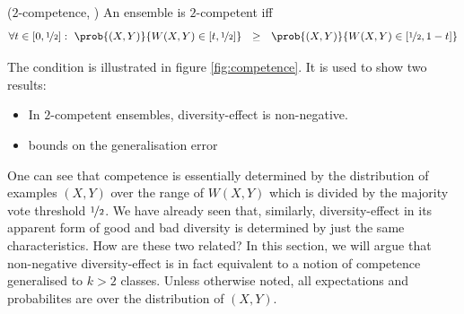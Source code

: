 \documentclass[../main.tex]{subfiles}
\begin{document}
\begin{definition} 
   \label{def:2-competence} 
    ($2$-competence, \cite{theisen_WhenAreEnsembles_2023}) An ensemble is $2$-competent iff
$$
\forall t \in \left[ 0, \nicefrac{1}{2} \right]: ~ \prob{(X,Y) }{W(X,Y)  \in \left[ t, \nicefrac{1}{2} \right]} ~ ~  \geq ~ ~ \prob{(X,Y) }{W(X,Y) \in \left[ \nicefrac{1}{2}, 1-t \right]}
$$
\end{definition}
The condition is illustrated in figure \ref{fig:competence}.  
It is used to show two results:
\begin{itemize}
	\item In $2$-competent ensembles, diversity-effect is non-negative.
	\item bounds on the generalisation error  %
\end{itemize}

One can see that competence is essentially determined by the distribution of examples $(X,Y)$ over the range of $W(X,Y)$ which is divided by the majority vote threshold $\nicefrac{1}{2}$. We have already seen that, similarly, diversity-effect in its apparent form of good and bad diversity is determined by just the same characteristics. How are these two related?
In this section, we will argue that non-negative diversity-effect is in fact equivalent to a notion of competence generalised to $k > 2$ classes. Unless otherwise noted, all expectations and probabilites are over the distribution of $(X,Y)$.
\end{document}
